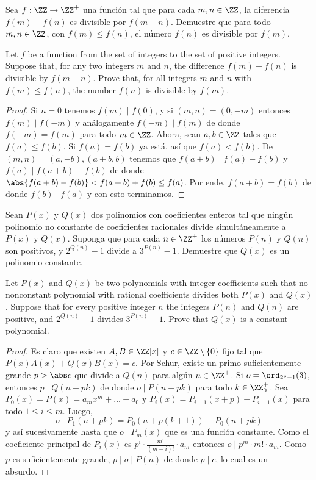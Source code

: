 \begin{probMG}
  Sea $f:\ZZ\to\ZZ^+$ una función tal que para cada $m,n\in\ZZ$, la diferencia
  $f(m)-f(n)$ es divisible por $f(m-n)$. Demuestre que para todo $m,n\in\ZZ$,
  con $f(m)\le f(n)$, el número $f(n)$ es divisible por $f(m)$.
  \begin{hint}
    Let $f$ be a function from the set of integers to the set of positive
    integers. Suppose that, for any two integers $m$ and $n$, the difference
    $f(m)-f(n)$ is divisible by $f(m-n)$. Prove that, for all integers $m$ and
    $n$ with $f(m)\le f(n)$, the number $f(n)$ is divisible by $f(m)$.
  \end{hint}
\end{probMG}

\begin{proof}
  Si $n=0$ tenemos $f(m)\mid f(0)$, y si $(m,n)=(0,-m)$ entonces
  $f(m)\mid f(-m)$ y análogamente $f(-m)\mid f(m)$ de donde $f(-m)=f(m)$ para
  todo $m\in\ZZ$. Ahora, sean $a,b\in\ZZ$ tales que $f(a)\le f(b)$. Si
  $f(a)=f(b)$ ya está, así que $f(a)<f(b)$. De $(m,n)=(a,-b),(a+b,b)$ tenemos
  que $f(a+b)\mid f(a)-f(b)$ y $f(a)\mid f(a+b)-f(b)$ de donde
  $\abs{f(a+b)-f(b)}<f(a+b)+f(b)\le f(a)$. Por ende, $f(a+b)=f(b)$ de donde
  $f(b)\mid f(a)$ y con esto terminamos.
\end{proof}

\begin{probMG}[ISL 2011/N6]
  Sean $P(x)$ y $Q(x)$ dos polinomios con coeficientes enteros tal que ningún
  polinomio no constante de coeficientes racionales divide simultáneamente a
  $P(x)$ y $Q(x)$. Suponga que para cada $n\in\ZZ^+$ los números $P(n)$ y $Q(n)$
  son positivos, y $2^{Q(n)}-1$ divide a $3^{P(n)}-1$. Demuestre que $Q(x)$ es
  un polinomio constante.
  \begin{hint}
    Let $P(x)$ and $Q(x)$ be two polynomials with integer coefficients such that
    no nonconstant polynomial with rational coefficients divides both $P(x)$ and
    $Q(x)$. Suppose that for every positive integer $n$ the integers $P(n)$ and
    $Q(n)$ are positive, and $2^{Q(n)}-1$ divides $3^{P(n)}-1$. Prove that
    $Q(x)$ is a constant polynomial.
  \end{hint}
\end{probMG}

\begin{proof}
  Es claro que existen $A,B\in\ZZ[x]$ y $c\in\ZZ\setminus\{0\}$ fijo tal que
  $P(x)A(x)+Q(x)B(x)=c$. Por Schur, existe un primo suficientemente grande
  $p>\abs c$ que divide a $Q(n)$ para algún $n\in\ZZ^+$. Si $o=\ord_{2^p-1}(3)$,
  entonces $p\mid Q(n+pk)$ de donde $o\mid P(n+pk)$ para todo $k\in\ZZ^+_0$. Sea
  $P_0(x)=P(x)=a_mx^m+\dots+a_0$ y $P_i(x)=P_{i-1}(x+p)-P_{i-1}(x)$ para todo
  $1\le i\le m$. Luego,
  \[o\mid P_1(n+pk)=P_0(n+p(k+1))-P_0(n+pk)\]
  y así sucesivamente hasta que $o\mid P_m(x)$ que es una función constante.
  Como el coeficiente principal de $P_i(x)$ es
  $p^i\cdot\frac{m!}{(m-i)!}\cdot a_m$ entonces $o\mid p^m\cdot m!\cdot a_m$.
  Como $p$ es suficientemente grande, $p\mid o\mid P(n)$ de donde $p\mid c$, lo
  cual es un absurdo.
\end{proof}

